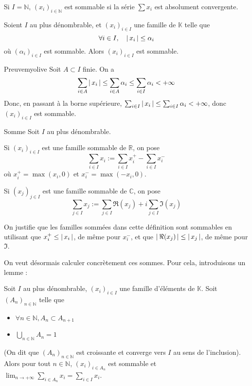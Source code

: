     Si $I = \mathbb{N}$, $(x_i)_{i \in \mathbb{N}}$ est sommable si la série $\sum x_i$ est absolument convergente.

    \begin{prop}{}{}
        Soient $I$ au plus dénombrable, et $(x_i)_{i \in I}$ une famille de $\mathbb{K}$ telle que 
        \[ \forall i \in I, \quad \left\lvert \,x_i \, \right\rvert \leq \alpha_i \] où $(\alpha_i)_{i \in I}$ est sommable. Alors $(x_i)_{i \in I}$ est sommable.
    \end{prop}

    \begin{demo}{Preuve}{myolive}
        Soit $A \subset I$ finie. On a 
        \[ \sum_{i \in A} \left\lvert \,x_i \, \right\rvert \leq \sum_{i \in A} \alpha_i \leq \sum_{i \in I} \alpha_i < +\infty \]   
        Donc, en passant à la borne supérieure, $\sum_{i \in I} \left\lvert \,x_i \, \right\rvert \leq \sum_{i \in I} \alpha_i < + \infty$, donc $(x_i)_{i \in I}$ est sommable.
    \end{demo}

    \begin{defi}{Somme}{}
        Soit $I$ au plus dénombrable.
        
        Si $(x_i)_{i \in I}$ est une famille sommable de $\mathbb{R}$, on pose 
        \[ \sum_{i \in I} x_i := \sum_{i \in I} x_i^+ - \sum_{i \in I} x_i^- \]   
        où $x_i^+ = \max(x_i, 0)$ et $x_i^- = \max(-x_i,0)$.

        Si $(x_j)_{j \in I}$ est une famille sommable de $\mathbb{C}$, on pose
        \[ \sum_{j \in I} x_j := \sum_{j \in I} \Re(x_j) + i \sum_{j \in I} \Im(x_j) \]    
    \end{defi}

    On justifie que les familles sommées dans cette définition sont sommables en utilisant que $x_i^+ \leq \left\lvert \,x_i \, \right\rvert$, de même pour $x_i^-$, et que $\left\lvert \,\Re(x_j) \, \right\rvert \leq \left\lvert \,x_j \, \right\rvert$, de même pour $\Im$.

    On veut désormais calculer concrètement ces sommes. Pour cela, introduisons un lemme :

    \begin{lem}{}{}
        Soit $I$ au plus dénombrable, $(x_i)_{i \in I}$ une famille d’éléments de $\mathbb{K}$. Soit $(A_n)_{n \in \mathbb{N}}$ telle que 
        \begin{itemize}
            \item $\forall n \in \mathbb{N}, A_n \subset A_{n +1}$ 
            \item $\bigcup_{n \in \mathbb{N}} A_n = 1$
        \end{itemize}
        (On dit que $(A_n)_{n \in \mathbb{N}}$ est croissante et converge vers $I$ au sens de l’inclusion). Alors pour tout $n \in \mathbb{N}$, $(x_i)_{i \in A_n}$ est sommable et $\lim_{n \to +\infty} \sum_{i \in A_n} x_i = \sum_{i \in I} x_i$.
    \end{lem}

